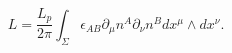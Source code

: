 \begin{equation}
L=\frac{L_p}{2\pi }\int_\Sigma \epsilon _{AB}\partial _\mu
n^A\partial _\nu n^Bdx^\mu \wedge dx^\nu .  \label{1c}
\end{equation}

